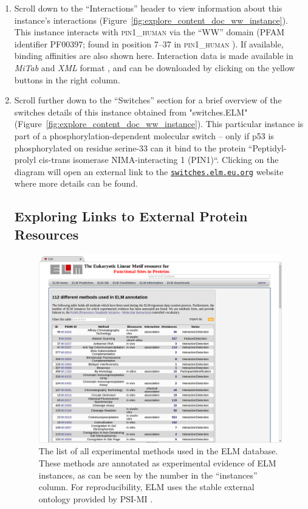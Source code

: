 \documentclass[12pt]{article}
\newcommand\rurl[1]{%
	\href{http://#1}{\nolinkurl{#1}}%
}
\newcommand\uniprot[1]{%
	\textsc{\lowercase{#1}}%
}
\newcommand\fileformat[1]{%
    \textit{#1}{}%
}%
\begin{document}
\begin{enumerate}
\item Scroll down to the ``Interactions'' header to view information about this
	instance's interactions
	(Figure~\ref{fig:explore_content_doc_ww_instance}). This instance
	interacts with \uniprot{PIN1\_Human} via the ``WW'' domain (PFAM identifier
	PF00397; found in position 7--37 in \uniprot{PIN1\_Human}). If available,
	binding affinities are also shown here. Interaction data is made
	available in \fileformat{MiTab} and \fileformat{XML} format
	\citep{17925023}, and can be downloaded by clicking on the yellow
	buttons in the right column.

\item Scroll further down to the ``Switches'' section for a brief overview of
	the switches details of this instance obtained from "switches.ELM"
	\citep{23550212} (Figure~\ref{fig:explore_content_doc_ww_instance}). This
	particular instance is part of a phosphorylation-dependent molecular switch --
	only if p53 is phosphorylated on residue serine-33 can it bind to the protein
	``Peptidyl-prolyl cis-trans isomerase NIMA-interacting 1 (PIN1)``.
	Clicking on the diagram will open an external link to the
	\rurl{switches.elm.eu.org} website where more details can be found.

%
%
\subsection*{Exploring Links to External Protein Resources}
\label{subsec:explore_content_links_to_external_resources}

\begin{figure}[h!]
	\centering
	\includegraphics[width=\textwidth]{Figures/explore_content/methods.png}
	\caption{
		The list of all experimental methods used in the ELM database.
		These methods are annotated as experimental evidence of ELM
		instances, as can be seen by the number in the ``instances''
		column. For reproducibility, ELM uses the stable external
		ontology provided by PSI-MI \citep{17925023}.
	}
	\label{fig:explore_content_methods}
\end{figure}


\end{enumerate}
\end{document}
